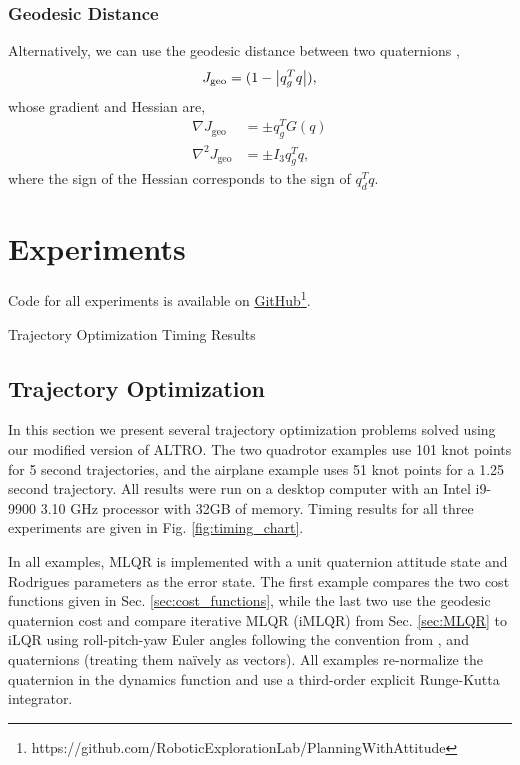 \documentclass[letterpaper, 10 pt, conference]{ieeeconf}  %
\begin{document}
        \subsubsection{Geodesic Distance}
            Alternatively, we can use the geodesic distance between two quaternions
            \cite{Kuffner2004},
            \begin{equation} \label{eq:quat_geodesic}
                J_\text{geo} = (1-\abs{q_g^T q}) ,
            \end{equation}
            whose gradient and Hessian are,
            \begin{align}
                \nabla J_\text{geo} &= \pm q_g^T G(q) \\
                \nabla^2 J_\text{geo} &= \pm I_3 q_g^T q ,
            \end{align}
            where the sign of the Hessian corresponds to the sign of $q_d^T q$.


\section{Experiments} \label{sec:experiments}
    Code for all experiments is available on 
    \href{https://github.com/RoboticExplorationLab/PlanningWithAttitude}
    {GitHub\footnote{\url{https://github.com/RoboticExplorationLab/PlanningWithAttitude}}}.

    \begin{table}
        \centering
        
        \label{tab:timing_results}
        \caption{Trajectory Optimization Timing Results}
    \end{table}
        
    \subsection{Trajectory Optimization}
        In this section we present several trajectory optimization problems solved using
        our modified version of ALTRO. The two quadrotor examples use 101 knot points for
        5 second trajectories, and the airplane example uses 51 knot points for a 1.25
        second trajectory. All results were run on a desktop computer with an Intel
        i9-9900 3.10 GHz processor with 32GB of memory. Timing results for all three
        experiments are given in Fig. \ref{fig:timing_chart}.
        
        In all examples, MLQR is implemented with a unit quaternion attitude state and
        Rodrigues parameters as the error state. The first example compares the two cost
        functions given in Sec. \ref{sec:cost_functions}, while the last two use the
        geodesic quaternion cost and compare iterative MLQR (iMLQR) from Sec.
        \ref{sec:MLQR} to iLQR using roll-pitch-yaw Euler angles following the convention
        from \cite{michael2010grasp}, and quaternions (treating them na\"ively as
        vectors). All examples re-normalize the quaternion in the dynamics function and
        use a third-order explicit Runge-Kutta integrator.
        
\end{document}
